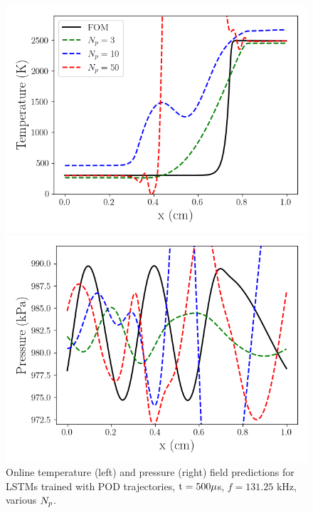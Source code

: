\begin{figure}
    \begin{minipage}{0.49\linewidth}
        \includegraphics[width=0.99\linewidth]{Chapters/TransientFlame/Images/lstm/pod_rom_temp_snaps.png}
    \end{minipage}
    \begin{minipage}{0.49\linewidth}
        \includegraphics[width=0.99\linewidth]{Chapters/TransientFlame/Images/lstm/pod_rom_press_snaps.png}
    \end{minipage}
    \caption{Online temperature (left) and pressure (right) field predictions for LSTMs trained with POD trajectories, $\text{t} = 500 \mu$s, $f = 131.25$ kHz, various $N_p$.}
\end{figure}

